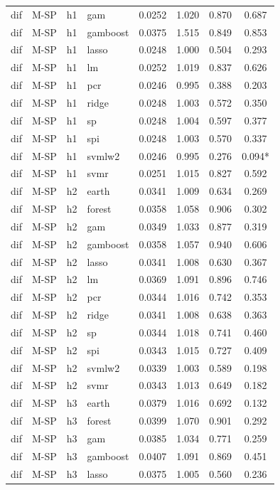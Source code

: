\begin{ThreePartTable}
\begin{longtable}[t]{llclcccc}
dif & M-SP & h1 & gam & 0.0252 & 1.020 & 0.870 & 0.687\\
dif & M-SP & h1 & gamboost & 0.0375 & 1.515 & 0.849 & 0.853\\
dif & M-SP & h1 & lasso & 0.0248 & 1.000 & 0.504 & 0.293\\
dif & M-SP & h1 & lm & 0.0252 & 1.019 & 0.837 & 0.626\\
dif & M-SP & h1 & pcr & 0.0246 & 0.995 & 0.388 & 0.203\\
dif & M-SP & h1 & ridge & 0.0248 & 1.003 & 0.572 & 0.350\\
dif & M-SP & h1 & sp & 0.0248 & 1.004 & 0.597 & 0.377\\
dif & M-SP & h1 & spi & 0.0248 & 1.003 & 0.570 & 0.337\\
dif & M-SP & h1 & svmlw2 & 0.0246 & 0.995 & 0.276 & 0.094*\\
dif & M-SP & h1 & svmr & 0.0251 & 1.015 & 0.827 & 0.592\\
\addlinespace
dif & M-SP & h2 & earth & 0.0341 & 1.009 & 0.634 & 0.269\\
dif & M-SP & h2 & forest & 0.0358 & 1.058 & 0.906 & 0.302\\
dif & M-SP & h2 & gam & 0.0349 & 1.033 & 0.877 & 0.319\\
dif & M-SP & h2 & gamboost & 0.0358 & 1.057 & 0.940 & 0.606\\
dif & M-SP & h2 & lasso & 0.0341 & 1.008 & 0.630 & 0.367\\
dif & M-SP & h2 & lm & 0.0369 & 1.091 & 0.896 & 0.746\\
dif & M-SP & h2 & pcr & 0.0344 & 1.016 & 0.742 & 0.353\\
dif & M-SP & h2 & ridge & 0.0341 & 1.008 & 0.638 & 0.363\\
dif & M-SP & h2 & sp & 0.0344 & 1.018 & 0.741 & 0.460\\
dif & M-SP & h2 & spi & 0.0343 & 1.015 & 0.727 & 0.409\\
dif & M-SP & h2 & svmlw2 & 0.0339 & 1.003 & 0.589 & 0.198\\
dif & M-SP & h2 & svmr & 0.0343 & 1.013 & 0.649 & 0.182\\
\addlinespace
dif & M-SP & h3 & earth & 0.0379 & 1.016 & 0.692 & 0.132\\
dif & M-SP & h3 & forest & 0.0399 & 1.070 & 0.901 & 0.292\\
dif & M-SP & h3 & gam & 0.0385 & 1.034 & 0.771 & 0.259\\
dif & M-SP & h3 & gamboost & 0.0407 & 1.091 & 0.869 & 0.451\\
dif & M-SP & h3 & lasso & 0.0375 & 1.005 & 0.560 & 0.236\\

\end{longtable}
\end{ThreePartTable}
